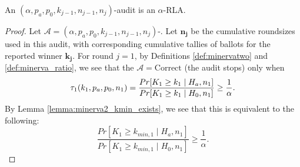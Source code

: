\begin{theorem}
\label{thm:minerva2_is_rla_new}
An $(\alpha,p_a, p_0,k_{j-1},n_{j-1},n_j)$-\Providence audit is an
$\alpha$-RLA.
\end{theorem}
\begin{proof}
Let $\mathcal{A}=(\alpha,p_a, p_0,k_{j-1},n_{j-1},n_j)$-\Providence.
Let $\bm{n_j}$ be the cumulative roundsizes used in this
audit, with corresponding cumulative tallies of
ballots for the reported winner $\bm{k_j}$.
For round $j=1$, by Definitions \ref{def:minervatwo}
and \ref{def:minerva_ratio}, we see that
the $\mathcal{A}=\text{Correct}$ (the audit stops) only when
$$
\tau_1(k_{1},p_a,p_0,n_1)\\
=\frac{Pr[K_{1} \geq k_{1} \mid H_a, n_1]}{Pr[K_{1} \geq k_{1} \mid H_0, n_1]}
\ge \frac{1}{\alpha}.
$$
By Lemma \ref{lemma:minerva2_kmin_exists}, we see that this
is equivalent to the following:
$$
\frac{Pr[K_{1} \geq k_{min,1} \mid H_a, n_1]}{Pr[K_{1} \geq k_{min, 1} \mid H_0, n_1]}
\ge \frac{1}{\alpha}.
$$


\end{proof}
